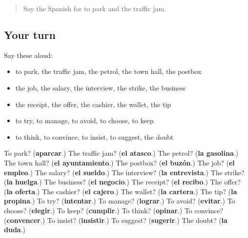 \begin{quote}
Say the Spanish for to park and the traffic jam.
\end{quote}

\subsection*{Your turn}
Say these aloud:

\begin{itemize}
\raggedright
  \item to park, the traffic jam, the petrol, the town hall, the postbox
  \item the job, the salary, the interview, the strike, the business
  \item the receipt, the offer, the cashier, the wallet, the tip
  \item to try, to manage, to avoid, to choose, to keep
  \item to think, to convince, to insist, to suggest, the doubt
\end{itemize}

\begin{tcolorbox}[breakable,colback=teal!4,colframe=teal!35!black,title={Before you move on}]
To park? (\textbf{aparcar}.) The traffic jam? (\textbf{el atasco}.) The petrol? (\textbf{la gasolina}.) The town hall? (\textbf{el ayuntamiento}.) The postbox? (\textbf{el buzón}.) The job? (\textbf{el empleo}.) The salary? (\textbf{el sueldo}.) The interview? (\textbf{la entrevista}.) The strike? (\textbf{la huelga}.) The business? (\textbf{el negocio}.) The receipt? (\textbf{el recibo}.) The offer? (\textbf{la oferta}.) The cashier? (\textbf{el cajero}.) The wallet? (\textbf{la cartera}.) The tip? (\textbf{la propina}.) To try? (\textbf{intentar}.) To manage? (\textbf{lograr}.) To avoid? (\textbf{evitar}.) To choose? (\textbf{elegir}.) To keep? (\textbf{cumplir}.) To think? (\textbf{opinar}.) To convince? (\textbf{convencer}.) To insist? (\textbf{insistir}.) To suggest? (\textbf{sugerir}.) The doubt? (\textbf{la duda}.)
\end{tcolorbox}
